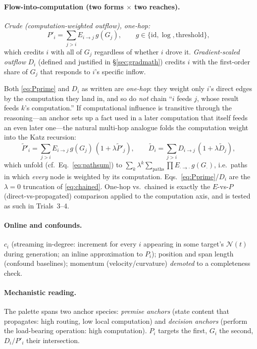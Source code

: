 \documentclass[11pt]{article}
\begin{document}
\paragraph{Flow-into-computation (two forms $\times$ two reaches).}
\emph{Crude (computation-weighted outflow), one-hop:}
\begin{equation}
P'_i=\sum_{j>i}E_{i\to j}\,g(G_j),\qquad g\in\{\mathrm{id},\log,\text{threshold}\},
\label{eq:Pprime}
\end{equation}
which credits $i$ with all of $G_j$ regardless of whether $i$ drove it.
\emph{Gradient-scaled outflow} $D_i$ (defined and justified in \S\ref{sec:gradmath}) credits $i$ with
the first-order share of $G_j$ that responds to $i$'s specific inflow.

Both \eqref{eq:Pprime} and $D_i$ as written are \emph{one-hop}: they weight only $i$'s direct edges by
the computation they land in, and so do \emph{not} chain ``$i$ feeds $j$, whose result feeds $k$'s
computation.'' If computational influence is transitive through the reasoning---an anchor sets up a
fact used in a later computation that itself feeds an even later one---the natural multi-hop analogue
folds the computation weight into the Katz recursion:
\begin{equation}
\widetilde P'_i=\sum_{j>i}E_{i\to j}\,g(G_j)\,(1+\lambda\widetilde P'_j),
\qquad
\widetilde D_i=\sum_{j>i}D_{i\to j}\,(1+\lambda\widetilde D_j),
\label{eq:chained}
\end{equation}
which unfold (cf.\ Eq.~\ref{eq:pathsum}) to $\sum_k\lambda^k\sum_{\text{paths}}\prod E_{\cdot\to\cdot}\,g(G_\cdot)$,
i.e.\ paths in which \emph{every} node is weighted by its computation. Eqs.~\eqref{eq:Pprime}/$D_i$ are
the $\lambda{=}0$ truncation of \eqref{eq:chained}. One-hop vs.\ chained is exactly the $E$-vs-$P$
(direct-vs-propagated) comparison applied to the computation axis, and is tested as such in Trials~3--4.

\paragraph{Online and confounds.}
$c_i$ (streaming in-degree: increment for every $i$ appearing in some target's $\mathcal N(t)$ during
generation; an inline approximation to $P_i$); position and span length (confound baselines);
momentum (velocity/curvature) \emph{demoted} to a completeness check.

\paragraph{Mechanistic reading.} The palette spans two anchor species: \emph{premise anchors} (state
content that propagates: high routing, low local computation) and \emph{decision anchors} (perform
the load-bearing operation: high computation). $P_i$ targets the first, $G_i$ the second, $D_i/P'_i$
their intersection.
\end{document}
